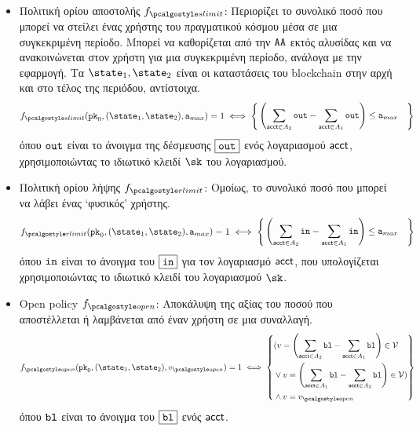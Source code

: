 \begin{itemize}
    \item Πολιτική ορίου αποστολής $f_{\sendlimit}$: Περιορίζει το συνολικό ποσό που μπορεί να στείλει ένας χρήστης του πραγματικού κόσμου μέσα σε μια συγκεκριμένη περίοδο. Μπορεί να καθορίζεται από την $\AA$ εκτός αλυσίδας και να ανακοινώνεται στον χρήστη για μια συγκεκριμένη περίοδο, ανάλογα με την εφαρμογή. Τα $\snap_1, \snap_2$ είναι οι καταστάσεις του blockchain στην αρχή και στο τέλος της περιόδου, αντίστοιχα.
    \begin{align*}
        f_{\sendlimit}(\inpk, (\snap_1, \snap_2), \srlimit) = 1 \iff 
        \left\{ \begin{aligned}
                            &  \left(\sum_{\acct\in A_2}{\varout} - \sum_{\acct \in A_1}{\varout} \right)
                            \leq \srlimit 
                 \end{aligned} \right\}
    \end{align*}
    όπου $\varout$ είναι το άνοιγμα της δέσμευσης $\comm{\varout}$ ενός λογαριασμού $\acct$, χρησιμοποιώντας το ιδιωτικό κλειδί $\sk$ του λογαριασμού.

    \item Πολιτική ορίου λήψης $f_{\receivelimit}$: Ομοίως, το συνολικό ποσό που μπορεί να λάβει ένας `φυσικός' χρήστης.
        \begin{align*}
           f_{\receivelimit}(\inpk, (\snap_1, \snap_2), \srlimit) = 1  \iff 
           \left\{ \begin{aligned} 
                    & \left(\sum_{\acct\in A_2}{\varin} - \sum_{\acct \in A_1}{\varin}\right) \leq \srlimit
            \end{aligned} \right\}
        \end{align*}
        όπου $\varin$ είναι το άνοιγμα του $\comm{\varin}$ για τον λογαριασμό $\acct$, που υπολογίζεται χρησιμοποιώντας το ιδιωτικό κλειδί του λογαριασμού $\sk$.

    \item Open policy $f_{\open}$: Αποκάλυψη της αξίας του ποσού που αποστέλλεται ή λαμβάνεται από έναν χρήστη σε μια συναλλαγή.
    \begin{align*}
        f_{\open}(\inpk, (\snap_1, \snap_2), v_{\open}) = 1 \iff 
        \left\{ \begin{aligned}   
        & (v = \left(\sum_{\acct \in A_{2}}\varbl - \sum_{\acct \in A_{1}}\varbl \right)\in \vset \\
        &\lor v = \left(\sum_{\acct \in A_{1}}\varbl - \sum_{\acct \in A_{2}}\varbl \right)\in \vset )\\
        & \land v = v_{\open} 
    \end{aligned} \right\}
    \end{align*}
    όπου $\varbl$ είναι το άνοιγμα του $\comm{\varbl}$ ενός $\acct$.


\end{itemize}
